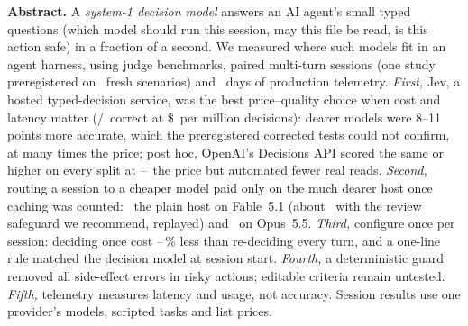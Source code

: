 \begin{center}\begin{minipage}{0.93\textwidth}\small
\noindent\textbf{Abstract.} A \emph{system-1 decision model} answers an AI agent's small typed questions (which model
should run this session, may this file be read, is this action safe) in a fraction of a second. We measured where such
models fit in an agent harness, using judge benchmarks, paired multi-turn sessions (one study preregistered on
\SOnePanelN\ fresh scenarios) and \ObDays\ days of production telemetry. \emph{First,} Jev, a hosted typed-decision
service, was the best price--quality choice when cost and latency matter (\JevHoldAccK/\HoldN\ correct at
\$\JevHoldCost\ per million decisions): dearer models were 8--11 points more accurate, which the preregistered
corrected tests could not confirm, at many times the price; post hoc, OpenAI's Decisions API scored the same or
higher on every split at \OaPriceXLo--\OaPriceXHi\X\ the price but automated fewer real reads. \emph{Second,} routing a
session to a cheaper model paid only on the much dearer host once caching was counted: \SHOneRatio\X\ the plain host
on Fable~5.1 (about \KpProxyTwo\X\ with the review safeguard we recommend, replayed) and \SHFiveRatio\X\ on Opus~5.5.
\emph{Third,} configure once per session: deciding once cost \HThreeOpusArmSaving--\HThreeFableArmSaving\,\% less than
re-deciding every turn, and a one-line rule matched the decision model at session start. \emph{Fourth,} a
deterministic guard removed all side-effect errors in risky actions; editable criteria remain untested.
\emph{Fifth,} telemetry measures latency and usage, not accuracy. Session results use one provider's models, scripted
tasks and list prices.
\end{minipage}\end{center}
